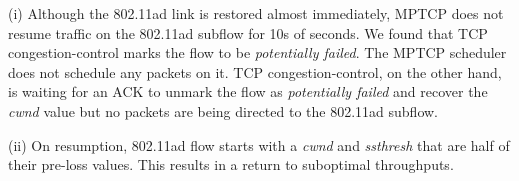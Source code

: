 \noindent(i) Although the 802.11ad link is restored 
almost immediately, 
MPTCP does not resume traffic on the 802.11ad subflow for
10s of seconds.
We found that 
TCP congestion-control 
marks
the flow to be
\emph{potentially failed}. The MPTCP scheduler 
does not schedule any
packets on it. TCP congestion-control, on the other hand, is waiting
for an ACK to 
unmark the flow as \emph{potentially failed} and 
recover the \emph{cwnd} value but no packets are being directed to
the 802.11ad subflow.

\noindent(ii) On
resumption, 802.11ad flow starts with a \emph{cwnd} and
\emph{ssthresh} that are half of their pre-loss
values. 
This results in a return to suboptimal throughputs.
